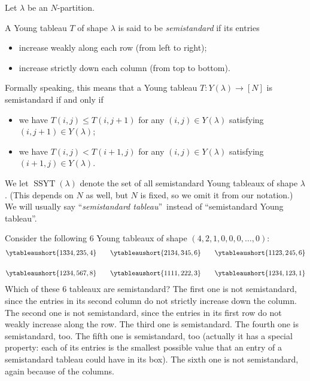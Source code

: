 \begin{definition}
\label{def.sf.ssyt}Let $\lambda$ be an $N$-partition.

A Young tableau $T$ of shape $\lambda$ is said to be \emph{semistandard} if
its entries

\begin{itemize}
\item increase weakly along each row (from left to right);

\item increase strictly down each column (from top to bottom).
\end{itemize}

Formally speaking, this means that a Young tableau $T:Y\left(  \lambda\right)
\rightarrow\left[  N\right]  $ is semistandard if and only if

\begin{itemize}
\item we have $T\left(  i,j\right)  \leq T\left(  i,j+1\right)  $ for any
$\left(  i,j\right)  \in Y\left(  \lambda\right)  $ satisfying $\left(
i,j+1\right)  \in Y\left(  \lambda\right)  $;

\item we have $T\left(  i,j\right)  <T\left(  i+1,j\right)  $ for any $\left(
i,j\right)  \in Y\left(  \lambda\right)  $ satisfying $\left(  i+1,j\right)
\in Y\left(  \lambda\right)  $.
\end{itemize}

We let $\operatorname*{SSYT}\left(  \lambda\right)  $ denote the set of all
semistandard Young tableaux of shape $\lambda$. (This depends on $N$ as well,
but $N$ is fixed, so we omit it from our notation.) We will usually say
\textquotedblleft\emph{semistandard tableau}\textquotedblright\ instead of
\textquotedblleft semistandard Young tableau\textquotedblright.
\end{definition}

\begin{example}
Consider the following $6$ Young tableaux of shape $\left(  4,2,1,0,0,0,\ldots
,0\right)  $:%
\begin{align}
&  \ytableaushort{1334,235,4}\qquad\ytableaushort{2134,345,6}\qquad
\ytableaushort{1123,245,6}\label{eq.def.sf.ssyt.1.1}\\
& \nonumber\\
&  \ytableaushort{1234,567,8}\qquad\ytableaushort{1111,222,3}\qquad
\ytableaushort{1234,123,1}\nonumber
\end{align}
Which of these $6$ tableaux are semistandard? The first one is not
semistandard, since the entries in its second column do not strictly increase
down the column. The second one is not semistandard, since the entries in its
first row do not weakly increase along the row. The third one is semistandard.
The fourth one is semistandard, too. The fifth one is semistandard, too
(actually it has a special property: each of its entries is the smallest
possible value that an entry of a semistandard tableau could have in its box).
The sixth one is not semistandard, again because of the columns.
\end{example}

